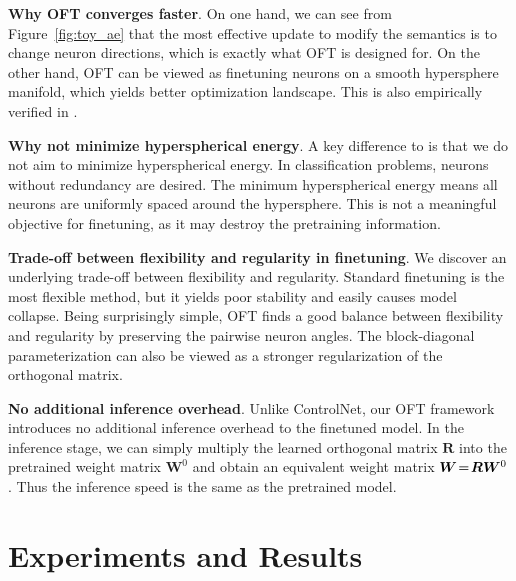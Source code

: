 \documentclass{article}
\begin{document}
\vspace{-0.4mm}


\textbf{Why OFT converges faster}. On one hand, we can see from Figure~\ref{fig:toy_ae} that the most effective update to modify the semantics is to change neuron directions, which is exactly what OFT is designed for. On the other hand, OFT can be viewed as finetuning neurons on a smooth hypersphere manifold, which yields better optimization landscape. This is also empirically verified in \cite{liu2021orthogonal}.

\vspace{-0.4mm}


\textbf{Why not minimize hyperspherical energy}. A key difference to \cite{liu2021orthogonal} is that we do not aim to minimize hyperspherical energy. In classification problems, neurons without redundancy are desired. The minimum hyperspherical energy means all neurons are uniformly spaced around the hypersphere. This is not a meaningful objective for finetuning, as it may destroy the pretraining information.

\vspace{-0.4mm}


\textbf{Trade-off between flexibility and regularity in finetuning}. We discover an underlying trade-off between flexibility and regularity. Standard finetuning is the most flexible method, but it yields poor stability and easily causes model collapse. Being surprisingly simple, OFT finds a good balance between flexibility and regularity by preserving the pairwise neuron angles. The block-diagonal parameterization can also be viewed as a stronger regularization of the orthogonal matrix. %

\vspace{-0.4mm}


\textbf{No additional inference overhead}. Unlike ControlNet, our OFT framework introduces no additional inference overhead to the finetuned model. In the inference stage, we can simply multiply the learned orthogonal matrix $\bm{R}$ into the pretrained weight matrix $\bm{W}^0$ and obtain an equivalent weight matrix $\thickmuskip=2mu \medmuskip=2mu \bm{W}=\bm{R}\bm{W}^0$. Thus the inference speed is the same as the pretrained model.


\vspace{-2.05mm}
\section{Experiments and Results}
\vspace{-1.75mm}
\end{document}

